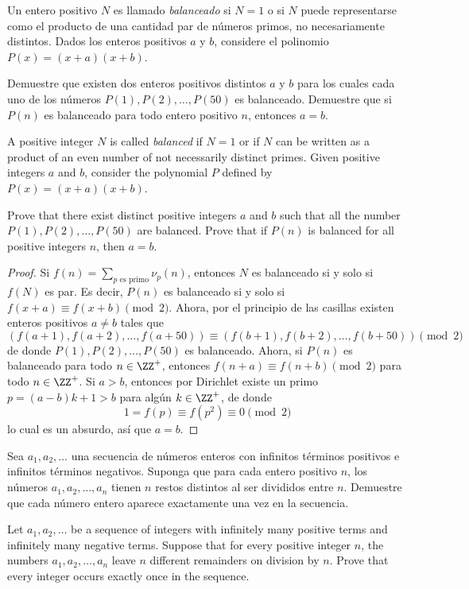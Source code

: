 \begin{probEG}[ISL 2009/N2]
  Un entero positivo $N$ es llamado \emph{balanceado} si $N=1$ o si $N$ puede
  representarse como el producto de una cantidad par de números primos, no
  necesariamente distintos. Dados los enteros positivos $a$ y $b$, considere el
  polinomio $P(x)=(x+a)(x+b)$.
  \begin{enumerate}[(a)]
    \ii Demuestre que existen dos enteros positivos distintos $a$ y $b$ para los
    cuales cada uno de los números $P(1),P(2),\dots,P(50)$ es balanceado.
    \ii Demuestre que si $P(n)$ es balanceado para todo entero positivo $n$,
    entonces $a=b$.
  \end{enumerate}
  \begin{hint}
    A positive integer $N$ is called \emph{balanced} if $N=1$ or if $N$ can be
    written as a product of an even number of not necessarily distinct primes.
    Given positive integers $a$ and $b$, consider the polynomial $P$ defined by
    $P(x)=(x+a)(x+b)$.
    \begin{enumerate}[(a)]
      \ii Prove that there exist distinct positive integers $a$ and $b$ such
      that all the number $P(1),P(2),\dots,P(50)$ are balanced.
      \ii Prove that if $P(n)$ is balanced for all positive integers $n$, then
      $a=b$.
    \end{enumerate}
  \end{hint}
\end{probEG}

\begin{proof}
  Si $f(n)=\sum_{p\text{ es primo}}\nu_p(n)$, entonces $N$ es balanceado si y
  solo si $f(N)$ es par. Es decir, $P(n)$ es balanceado si y solo si
  $f(x+a)\equiv f(x+b)\pmod 2$. Ahora, por el principio de las casillas existen
  enteros positivos $a\ne b$ tales que
  \[(f(a+1),f(a+2),\dots,f(a+50))\equiv(f(b+1),f(b+2),\dots,f(b+50))\pmod 2\]
  de donde $P(1),P(2),\dots,P(50)$ es balanceado. Ahora, si $P(n)$ es balanceado
  para todo $n\in\ZZ^+$, entonces $f(n+a)\equiv f(n+b)\pmod 2$ para todo
  $n\in\ZZ^+$. Si $a>b$, entonces por Dirichlet existe un primo $p=(a-b)k+1>b$
  para algún $k\in\ZZ^+$, de donde
  \[1=f(p)\equiv f(p^2)\equiv 0\pmod 2\]
  lo cual es un absurdo, así que $a=b$.
\end{proof}

\begin{probMG}
  Sea $a_1,a_2,\dots$ una secuencia de números enteros con infinitos términos
  positivos e infinitos términos negativos. Suponga que para cada entero
  positivo $n$, los números $a_1,a_2,\dots,a_n$ tienen $n$ restos distintos al
  ser divididos entre $n$. Demuestre que cada número entero aparece exactamente
  una vez en la secuencia.
  \begin{hint}
    Let $a_1,a_2,\dots$ be a sequence of integers with infinitely many positive
    terms and infinitely many negative terms. Suppose that for every positive
    integer $n$, the numbers $a_1,a_2,\dots,a_n$ leave $n$ different remainders
    on division by $n$. Prove that every integer occurs exactly once in the
    sequence.
  \end{hint}
\end{probMG}


